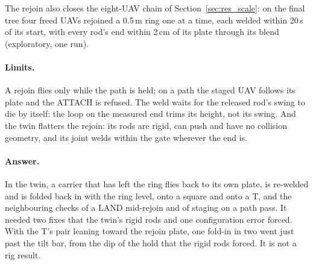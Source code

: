 The rejoin also closes the eight-UAV chain of Section~\ref{sec:res_scale}: on the final tree four freed UAVs
rejoined a 0.5\,m ring one at a time, each welded within 20\,s of its start, with every rod's end within 2\,cm of its
plate through its blend (exploratory, one run).


\paragraph{Limits.} A rejoin flies only while the path is held; on a path the staged UAV follows its plate and the
ATTACH is refused. The weld waits for the released rod's swing to die by itself: the loop on the measured end trims its
height, not its swing. And the twin flatters the rejoin: its rods are rigid, can push and have no collision geometry,
and its joint welds within the gate wherever the end is.

\paragraph{Answer.} In the twin, a carrier that has left the ring flies back to its own plate, is re-welded and is
folded back in with the ring level, onto a square and onto a T, and the neighbouring checks of a LAND mid-rejoin and of
staging on a path pass. It needed two fixes that the twin's rigid rods and one configuration error forced. With the
T's pair leaning toward the rejoin plate, one fold-in in two went just past the tilt bar, from the dip of the hold that
the rigid rods forced. It is not a rig result.

